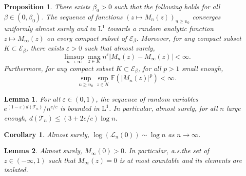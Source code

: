 \documentclass[10pt,a4paper]{amsart}
\newtheorem{proposition}{Proposition}
\newtheorem{lemma}{Lemma}
\newtheorem{corollary}{Corollary}
\def\E{\mathbb{E}}
\def \T{\mathcal{T}}
\def \cL{\mathcal{L}}
\def\vp{\varepsilon}
\begin{document}
\begin{proposition}\label{prop cv unif martingale}
	There exists $\beta_0>0$ such that the following holds for all $\beta\in (0, \beta_0)$. The sequence of functions $(z\mapsto M_n(z))_{n\ge n_0}$ converges uniformly almost surely and in $\mathrm{L}^1$ towards a random analytic function $z \mapsto M_\infty(z)$ on every compact subset of $\mathcal{E}_\beta$. Moreover, for any compact subset $K \subset \mathcal{E}_\beta$, there exists $\vp>0$ such that almost surely,
	\[
	\limsup_{n\to \infty} \max_{z \in K} n^\vp \vert M_n(z)-M_\infty(z)\vert <\infty.
	\]
	Furthermore, for any compact subset $K \subset \mathcal{E}_\beta$, for all $p>1$ small enough,
	\begin{equation}\label{eq M n borne dans L p}
	\sup_{n\ge n_0} \sup_{z \in K} \E\left( \vert M_n (z) \vert^p \right)<\infty.
	\end{equation}
\end{proposition}

\begin{lemma}\label{lemme controle hauteur totale}
	For all $\vp \in (0,1)$, the sequence of random variables $e^{(1-\vp)d(\T_n)}/n^{e/c}$ is bounded in $\mathrm{L}^1$. In particular, almost surely, for all $n$ large enough, $d(\T_n)\le (3+2e/c)\log n$.
\end{lemma}

\begin{corollary}\label{cor controle transformee de Laplace}
	Almost surely, $ \log (\cL_n(0)) \sim \log n$ as $n\to \infty$.
\end{corollary}

\begin{lemma}\label{lemme limite non nulle}
	Almost surely, $M_\infty(0)> 0$. In particular, a.s.\@ the set of $z \in (-\infty, 1)$ such that $M_\infty(z) =0$ is at most countable and its elements are isolated.
\end{lemma}
\end{document}
